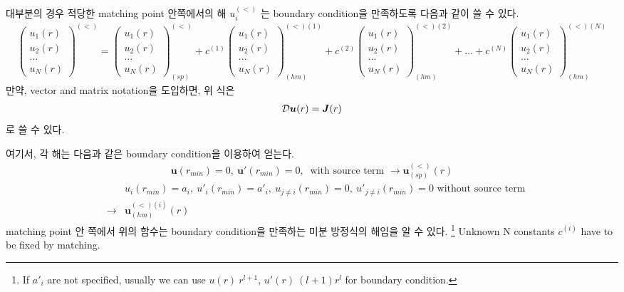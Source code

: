 \documentclass[10pt]{book}
\def\bm{\boldsymbol}
\newcommand{\bea}{\begin{eqnarray}}
\newcommand{\eea}{\end{eqnarray}}
\newcommand{\no}{\nonumber \\}
\begin{document}
대부분의 경우 적당한 matching point 안쪽에서의 해 $u_i^{(<)}$ 는 boundary 
condition을 만족하도록 다음과 같이 쓸 수 있다. 
\bea 
\left(\begin{array}{c} u_1(r) \\ u_2(r) \\ \dots \\ u_N(r) \end{array}  \right)^{(<)}
=\left(\begin{array}{c} u_1(r) \\ u_2(r) \\ \dots \\ u_N(r) \end{array}  \right)_{(sp)}^{(<)}
+c^{(1)}
 \left(\begin{array}{c} u_1(r) \\ u_2(r) \\ \dots \\ u_N(r) \end{array}  \right)^{(<)(1)}_{(hm)}
+c^{(2)}
 \left(\begin{array}{c} u_1(r) \\ u_2(r) \\ \dots \\ u_N(r) \end{array}  \right)^{(<)(2)}_{(hm)}
+\dots 
+c^{(N)}
 \left(\begin{array}{c} u_1(r) \\ u_2(r) \\ \dots \\ u_N(r) \end{array}  \right)^{(<)(N)}_{(hm)}  
\eea 
만약, vector and matrix notation을 도입하면, 위 식은 
\bea 
{\cal D}{\bm u}(r)={\bm J}(r) 
\eea 
로 쓸 수 있다. 

여기서, 각 해는 다음과 같은 boundary condition을 이용하여 얻는다. 
\bea 
{\bm u}(r_{min})=0,\ {\bm u}'(r_{min})=0,\ \mbox{ with source term } 
\rightarrow  {\bm u}_{(sp)}^{(<)}(r) 
\eea 
\bea 
& &u_i(r_{min})=a_i,\ u'_i(r_{min})=a'_i, \ u_{j\neq i}(r_{min})=0,\ u'_{j\neq i}(r_{min})=0
\mbox{ without source term} \no 
&\rightarrow & {\bm u}_{(hm)}^{(<)(i)}(r)
\eea 
matching point 안 쪽에서 위의 함수는 boundary condition을 만족하는 미분 방정식의 해임을 알 수 있다.
\footnote{If 
$a'_i$ are not specified, usually we can use $u(r)~r^{l+1}$, $u'(r)~(l+1)r^l$ for boundary 
condition.} Unknown N constants $c^{(i)}$ have to be fixed by matching.
\end{document}
